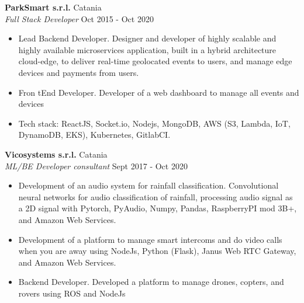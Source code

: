 \documentclass[a4paper]{article}
\begin{document}
\textbf{ParkSmart s.r.l.} \hfill Catania\\
\textit{Full Stack Developer} \hfill Oct 2015 - Oct 2020\\
\vspace{-1mm}
\begin{itemize} \itemsep 1pt
	\item Lead Backend Developer. Designer and developer of highly scalable and highly available microservices application, built in a hybrid architecture cloud-edge, to deliver real-time geolocated events to users, and manage edge devices and payments from users.
	\item Fron tEnd Developer. Developer of a web dashboard to manage all events and devices
	\item Tech stack: ReactJS, Socket.io, Nodejs, MongoDB, AWS (S3, Lambda, IoT, DynamoDB, EKS), Kubernetes, GitlabCI.
\end{itemize}
\textbf{Vicosystems s.r.l.} \hfill Catania\\
\textit{ML/BE Developer consultant} \hfill Sept 2017 - Oct 2020\\
\vspace{-1mm}
\begin{itemize} \itemsep 1pt
	\item Development of an audio system for rainfall classification. Convolutional neural networks for audio classification of rainfall, processing audio signal as a 2D signal with Pytorch, PyAudio, Numpy, Pandas, RaspberryPI mod 3B+, and Amazon Web Services.
	\item Development of a platform to manage smart intercoms and do video calls when you are away using NodeJs, Python (Flask), Janus Web RTC Gateway, and Amazon Web Services.
	\item Backend Developer. Developed a platform to manage drones, copters, and rovers using ROS and NodeJs
\end{itemize}
\end{document}

